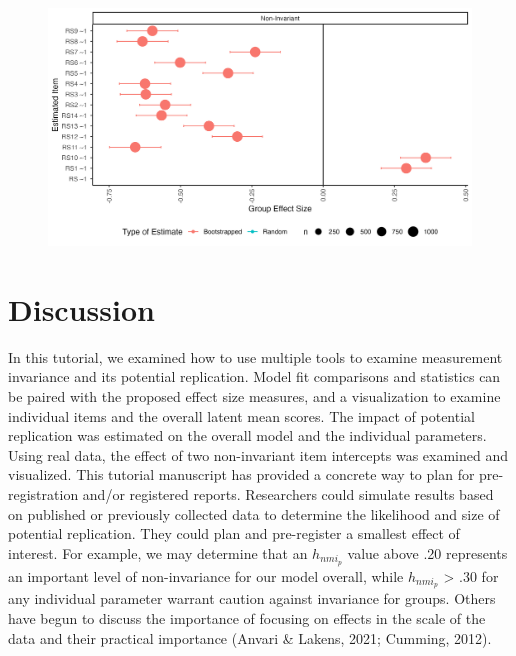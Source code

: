 \documentclass[
  man]{apa7}
\begin{document}
\begin{figure}
\includegraphics[width=8in]{figures/rs14-chinese-effect_invariance_plot} \end{figure}

\hypertarget{discussion}{%
\section{Discussion}\label{discussion}}

In this tutorial, we examined how to use multiple tools to examine measurement invariance and its potential replication. Model fit comparisons and statistics can be paired with the proposed effect size measures, and a visualization to examine individual items and the overall latent mean scores. The impact of potential replication was estimated on the overall model and the individual parameters. Using real data, the effect of two non-invariant item intercepts was examined and visualized. This tutorial manuscript has provided a concrete way to plan for pre-registration and/or registered reports. Researchers could simulate results based on published or previously collected data to determine the likelihood and size of potential replication. They could plan and pre-register a smallest effect of interest. For example, we may determine that an \(h_{nmi_p}\) value above .20 represents an important level of non-invariance for our model overall, while \(h_{nmi_p}\) \textgreater{} .30 for any individual parameter warrant caution against invariance for groups. Others have begun to discuss the importance of focusing on effects in the scale of the data and their practical importance (Anvari \& Lakens, 2021; Cumming, 2012).
\end{document}
